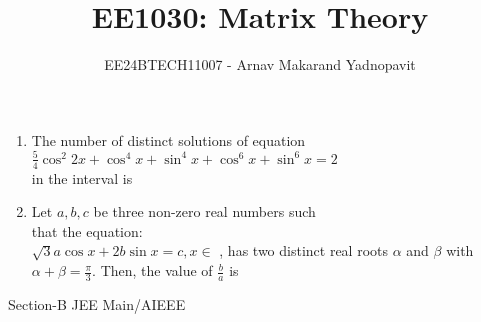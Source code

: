 \documentclass[journal,12pt,twocolumn]{IEEEtran}
\theoremstyle{remark}
\begin{document}

\vspace{3cm}

\title{EE1030: Matrix Theory}
\author{EE24BTECH11007 - Arnav Makarand Yadnopavit}
\maketitle
\newpage


\renewcommand{\thefigure}{\theenumi}
\renewcommand{\thetable}{\theenumi}

\begin{enumerate}[start=6]
\item The number of distinct solutions of equation
$\frac{5}{4}\cos^2 2x+\cos^4 x+\sin^4 x+\cos^6 x+\sin^6 x=2$
\\in the interval  is\hfill{} 
\item Let $a, b, c$ be three non-zero real numbers such
\\that the equation:
\\$\sqrt{3} a\cos x+2b\sin x = c,x\in$ 
, has two distinct real roots $\alpha$ and $\beta$ with $\alpha+\beta=\frac{\pi}{3}$. Then, the value of $\frac{b}{a}$ is
\hfill{}
\end{enumerate}
Section-B JEE Main/AIEEE
\end{document}

